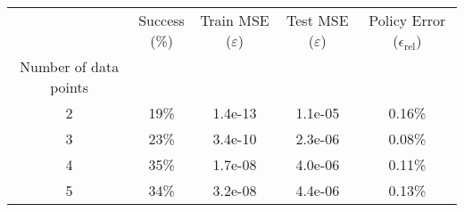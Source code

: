 \begin{tabular}{ccccc}
\toprule
{} & \shortstack{Success \\(\%)} & \shortstack{Train MSE \\ ($\varepsilon$)} & \shortstack{Test MSE \\ ($\varepsilon$)} & \shortstack{Policy Error\\ ($\epsilon_{\mathrm{rel}}$)} \\
Number of data points &                             &                                           &                                          &                                                         \\
\midrule
2                     &                        19\% &                                   1.4e-13 &                                  1.1e-05 &                                             0.16\% \\
3                     &                        23\% &                                   3.4e-10 &                                  2.3e-06 &                                             0.08\% \\
4                     &                        35\% &                                   1.7e-08 &                                  4.0e-06 &                                             0.11\% \\
5                     &                        34\% &                                   3.2e-08 &                                  4.4e-06 &                                             0.13\% \\
\bottomrule
\end{tabular}
